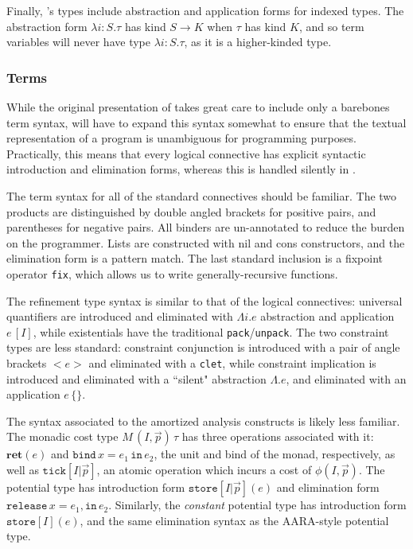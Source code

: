 Finally, \dlambdaamor's types include abstraction and application forms for indexed types. The abstraction form $\lambda i :S.\tau$ has kind $S \to K$ when $\tau$ has kind $K$, and so term variables will never have type $\lambda i : S.\tau$, as it is a higher-kinded type.

\subsubsection{Terms}
\label{}
While the original presentation of \lambdaamor takes great care to include only a barebones term syntax, \dlambdaamor will have to expand this syntax somewhat to ensure that the textual representation of a program is unambiguous for programming purposes. Practically, this means that every logical connective has explicit syntactic introduction and elimination forms, whereas this is handled silently in \lambdaamor.

The term syntax for all of the standard connectives should be familiar. The two products are distinguished by double angled brackets for positive pairs, and parentheses for negative pairs. All binders are un-annotated to reduce the burden on the programmer. Lists are constructed with nil and cons constructors, and the elimination form is a pattern match. The last standard inclusion is a fixpoint operator \texttt{fix}, which allows us to write generally-recursive functions. 

The refinement type syntax is similar to that of the logical connectives: universal quantifiers are introduced and eliminated with $\Lambda i. e$ abstraction and application $e \, [I]$, while existentials have the traditional \texttt{pack}/\texttt{unpack}. The two constraint types are less standard: constraint conjunction is introduced with a pair of angle brackets $<e>$ and eliminated with a \texttt{clet}, while constraint implication is introduced and eliminated with a ``silent" abstraction $\Lambda. e$, and eliminated with an application $e \, \{\}$.

The syntax associated to the amortized analysis constructs is likely less familiar. The monadic cost type $M \, (I,\vec{p}) \, \tau$ has three operations associated with it: $\textbf{ret}(e)$ and $\texttt{bind} \, x = e_1 \, \texttt{in}\, e_2$, the unit and bind of the monad, respectively, as well as $\texttt{tick}[I|\vec{p}]$, an atomic operation which incurs a cost of $\phi(I,\vec{p})$. The potential type has introduction form $\texttt{store}[I|\vec{p}](e)$ and elimination form $\texttt{release} \, x = e_1, \texttt{in} \, e_2$. Similarly, the \textit{constant} potential type has introduction form $\texttt{store}[I](e)$, and the same elimination syntax as the AARA-style potential type.

